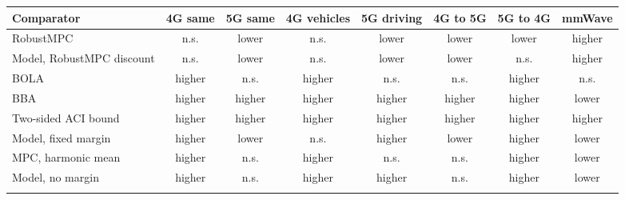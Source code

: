 \begin{tabular}{@{}lccccccc@{}}
\toprule
Comparator & 4G same & 5G same & 4G vehicles & 5G driving & 4G to 5G & 5G to 4G & mmWave \\
\midrule
RobustMPC & n.s. & lower & n.s. & lower & lower & lower & higher \\
Model, RobustMPC discount & n.s. & lower & n.s. & lower & lower & n.s. & higher \\
BOLA & higher & n.s. & higher & n.s. & n.s. & higher & n.s. \\
BBA & higher & higher & higher & higher & higher & higher & lower \\
Two-sided ACI bound & higher & higher & higher & higher & higher & higher & higher \\
Model, fixed margin & higher & lower & n.s. & higher & lower & higher & lower \\
MPC, harmonic mean & higher & n.s. & higher & n.s. & n.s. & higher & lower \\
Model, no margin & higher & n.s. & higher & higher & n.s. & higher & lower \\
\botrule
\end{tabular}
